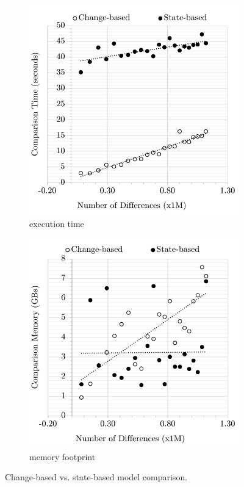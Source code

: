 \documentclass{llncs}
\begin{document}
\begin{figure}[ht]
   \centering
  \begin{subfigure}[t]{0.495\linewidth}
    \includegraphics[width=\linewidth]{images/Time-Diffs}
    \caption{execution time}
    \label{fig:time_diffs}
\end{subfigure}
\hfill
\begin{subfigure}[t]{0.495\linewidth}
    \includegraphics[width=\linewidth]{images/Memory-Diffs}
    \caption{memory footprint}
    \label{fig:memory_diffs}
\end{subfigure}
\caption{Change-based vs. state-based model comparison.}
\label{fig:change_vs_state}
\end{figure}
\end{document}
